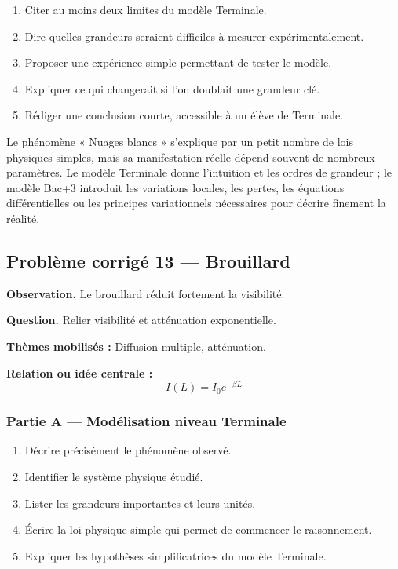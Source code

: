 \documentclass[11pt,a4paper]{article}
\begin{document}
\begin{enumerate}
  \item Citer au moins deux limites du modèle Terminale.
  \item Dire quelles grandeurs seraient difficiles à mesurer expérimentalement.
  \item Proposer une expérience simple permettant de tester le modèle.
  \item Expliquer ce qui changerait si l'on doublait une grandeur clé.
  \item Rédiger une conclusion courte, accessible à un élève de Terminale.
\end{enumerate}

\begin{corrigebox}
Le phénomène « Nuages blancs » s'explique par un petit nombre de lois physiques simples, mais sa manifestation réelle dépend souvent de nombreux paramètres. Le modèle Terminale donne l'intuition et les ordres de grandeur ; le modèle Bac+3 introduit les variations locales, les pertes, les équations différentielles ou les principes variationnels nécessaires pour décrire finement la réalité.
\end{corrigebox}

\subsection{Problème corrigé 13 — Brouillard}

\begin{exercicebox}
\textbf{Observation.} Le brouillard réduit fortement la visibilité.

\medskip
\textbf{Question.} Relier visibilité et atténuation exponentielle.

\medskip
\textbf{Thèmes mobilisés :} Diffusion multiple, atténuation.

\medskip
\textbf{Relation ou idée centrale :}
\[
I(L)=I_0e^{-\beta L}
\]
\end{exercicebox}

\subsubsection*{Partie A — Modélisation niveau Terminale}

\begin{enumerate}
  \item Décrire précisément le phénomène observé.
  \item Identifier le système physique étudié.
  \item Lister les grandeurs importantes et leurs unités.
  \item Écrire la loi physique simple qui permet de commencer le raisonnement.
  \item Expliquer les hypothèses simplificatrices du modèle Terminale.
\end{enumerate}
\end{document}
